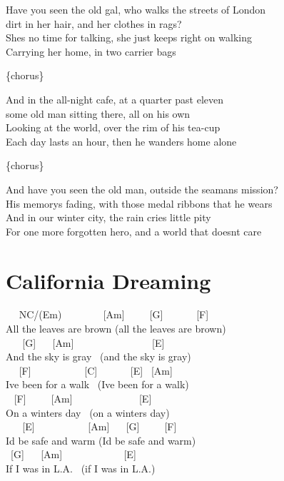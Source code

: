 \documentclass[
  letterpaper,
]{scrbook}
\begin{document}
Have you seen the old gal, who walks the streets of London\\
dirt in her hair, and her clothes in rags?\\
She\textquotesingle s no time for talking, she just keeps right on
walking\\
Carrying her home, in two carrier bags

\{chorus\}

And in the all-night cafe, at a quarter past eleven\\
some old man sitting there, all on his own\\
Looking at the world, over the rim of his tea-cup\\
Each day lasts an hour, then he wanders home alone

\{chorus\}

And have you seen the old man, outside the seaman\textquotesingle s
mission?\\
His memory\textquotesingle s fading, with those medal ribbons that he
wears\\
And in our winter city, the rain cries little pity\\
For one more forgotten hero, and a world that doesn\textquotesingle t
care

\hypertarget{california-dreaming}{%
\chapter{California Dreaming}\label{california-dreaming}}

~ ~NC/(Em) ~ ~ ~ ~ ~{[}Am{]} ~ ~ ~{[}G{]} ~ ~ ~ ~{[}F{]}\\
All the leaves are brown (all the leaves are brown)\\
\hspace*{0.333em} ~ ~ {[}G{]} ~ ~{[}Am{]} ~ ~ ~ ~ ~ ~ ~ ~ ~ {[}E{]}\\
And the sky is gray ~(and the sky is gray)\\
\hspace*{0.333em} ~ ~{[}F{]} ~ ~ ~ ~ ~ ~ {[}C{]} ~ ~ ~ ~{[}E{]}
~{[}Am{]}\\
I\textquotesingle ve been for a walk ~(I\textquotesingle ve been for a
walk)\\
\hspace*{0.333em} ~ {[}F{]} ~ ~ ~{[}Am{]} ~ ~ ~ ~ ~ ~ ~ ~{[}E{]}\\
On a winter\textquotesingle s day ~(on a winter\textquotesingle s day)\\
\hspace*{0.333em} ~ ~ {[}E{]} ~ ~ ~ ~ ~ ~ {[}Am{]} ~ ~{[}G{]} ~ ~
~{[}F{]}\\
I\textquotesingle d be safe and warm (I\textquotesingle d be safe and
warm)\\
\hspace*{0.333em} ~{[}G{]} ~ ~{[}Am{]} ~ ~ ~ ~ ~ ~ ~ {[}E{]}\\
If I was in L.A. ~(if I was in L.A.)
\end{document}
